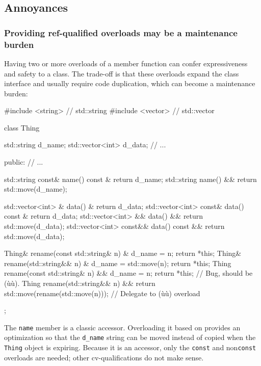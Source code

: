 \subsection[Annoyances]{Annoyances}\label{annoyances-refqualifier}

\subsubsection[Providing ref-qualified overloads may be a maintenance burden]{Providing ref-qualified overloads may be a maintenance burden}\label{providing-ref-qualified-overloads-may-be-a-maintenance-burden}

Having two or more  overloads of a member function
can confer expressiveness and safety to a class. The trade-off is that
these overloads expand the class interface and usually require code
duplication, which can become a maintenance burden:

\begin{emcppslisting}
#include <string>  // std::string
#include <vector>  // std::vector

class Thing
{
    std::string      d_name;
    std::vector<int> d_data;
    // ...

public:
    // ...

    std::string const& name() const & { return d_name; }
    std::string        name() &&      { return std::move(d_name); }

    std::vector<int>      &  data()       &  { return d_data; }
    std::vector<int> const&  data() const &  { return d_data; }
    std::vector<int>      && data()       && { return std::move(d_data); }
    std::vector<int> const&& data() const && { return std::move(d_data); }

    Thing& rename(const std::string& n) &  { d_name = n; return *this; }
    Thing& rename(std::string&& n) &  { d_name = std::move(n); return *this; }
    Thing  rename(const std::string& n) &&
    {
        d_name = n;
        return *this;  // Bug, should be (ù{}ù).
    }
    Thing  rename(std::string&& n) &&
    {
        return std::move(rename(std::move(n)));  // Delegate to (ù{}ù) overload
    }
};
\end{emcppslisting}
    

\noindent The \lstinline!name! member is a classic accessor. Overloading it based on
 provides an optimization so that the
\lstinline!d_name! string can be moved instead of copied when the
\lstinline!Thing! object is expiring. Because it is an accessor, only the
\lstinline!const!  and non\lstinline!const! 
overloads are needed; other cv-qualifications do not make sense.

